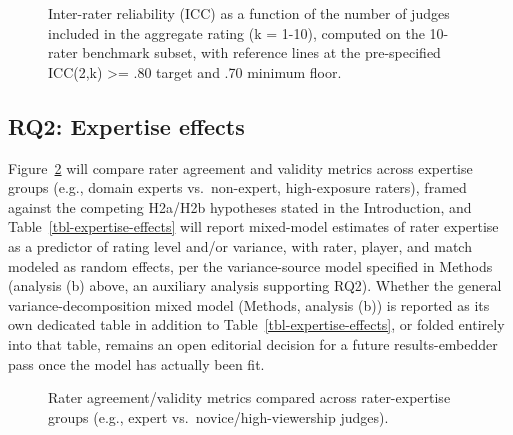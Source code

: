 \documentclass[
  12pt,
]{article}
\begin{document}
\begin{figure}

\centering{

}

\caption{\label{fig-icc-by-judge-count}Inter-rater reliability (ICC) as
a function of the number of judges included in the aggregate rating (k =
1-10), computed on the 10-rater benchmark subset, with reference lines
at the pre-specified ICC(2,k) \textgreater= .80 target and .70 minimum
floor.}

\end{figure}%

\begin{table}

\caption{\label{tbl-agreement-by-judge-count}Summary
agreement/reliability statistics (e.g., ICC with 95\% CIs and
category-usage checks) tabulated across candidate numbers of judges (2,
3, 5, and 10, all achievable from the 10-rater benchmark panel), with
the pre-specified ICC(2,k) \textgreater= .80 target / .70 floor noted
alongside the achieved values.}

\centering{

}

\end{table}%

\subsection{RQ2: Expertise effects}\label{rq2-expertise-effects}

Figure~\ref{fig-expertise-agreement} will compare rater agreement and
validity metrics across expertise groups (e.g., domain experts
vs.~non-expert, high-exposure raters), framed against the competing
H2a/H2b hypotheses stated in the Introduction, and
Table~\ref{tbl-expertise-effects} will report mixed-model estimates of
rater expertise as a predictor of rating level and/or variance, with
rater, player, and match modeled as random effects, per the
variance-source model specified in Methods (analysis (b) above, an
auxiliary analysis supporting RQ2). Whether the general
variance-decomposition mixed model (Methods, analysis (b)) is reported
as its own dedicated table in addition to
Table~\ref{tbl-expertise-effects}, or folded entirely into that table,
remains an open editorial decision for a future results-embedder pass
once the model has actually been fit.

\begin{figure}

\centering{

}

\caption{\label{fig-expertise-agreement}Rater agreement/validity metrics
compared across rater-expertise groups (e.g., expert
vs.~novice/high-viewership judges).}

\end{figure}%
\end{document}
